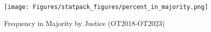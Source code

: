 \begin{landscape}
\begin{figure}[H]
\centering
\caption{Frequency in Majority by Justice (OT2018-OT2023)}
\vspace{1.5mm}
\texttt{[image: Figures/statpack\_figures/percent\_in\_majority.png]}

\end{figure}
\end{landscape}
